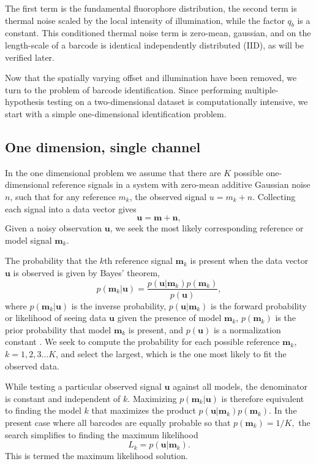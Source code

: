 The first term is the fundamental fluorophore distribution, the second term is thermal noise scaled by the local intensity of illumination, while the factor $q_b$ is a constant. This conditioned thermal noise term is zero-mean, gaussian, and on the length-scale of a barcode is identical independently distributed (IID), as will be verified later.

Now that the spatially varying offset and illumination have been removed, we turn to the problem of barcode identification. Since performing multiple-hypothesis testing on a two-dimensional dataset is computationally intensive, we start with a simple one-dimensional identification problem. 

\subsection{One dimension, single channel}
In the one dimensional problem we assume that there are $K$ possible one-dimensional reference signals in a system with zero-mean additive Gaussian noise $n$, such that for any reference $m_k$, the observed signal $u=m_k+n$. Collecting each signal into a data vector gives
\begin{equation}
\mathbf{u}=\mathbf{m} + \mathbf{n},
\end{equation}
Given a noisy observation $\mathbf{u}$, we seek the most likely corresponding reference or model signal $\mathbf{m}_k$. 

The probability that the $k$th reference signal $\mathbf{m}_k$ is present when the data vector $\mathbf{u}$ is observed is given by Bayes' theorem,
\begin{equation}\label{eq:Bayes}
p(\mathbf{m}_k|\mathbf{u}) = \frac{p(\mathbf{u}|\mathbf{m}_k)p(\mathbf{m}_k)} {p(\mathbf{u})},
\end{equation}
where $p(\mathbf{m}_k|\mathbf{u})$ is the inverse probability, $p(\mathbf{u}|\mathbf{m}_k)$ is the forward probability or likelihood of seeing data $\mathbf{u}$ given the presence of model $\mathbf{m}_k$, $p(\mathbf{m}_k)$ is the prior probability that model $\mathbf{m}_k$ is present, and $p(\mathbf{u})$ is a normalization constant \citep{bretthorst_probability_2003}. We seek to compute the probability for each possible reference $\mathbf{m}_k$, $k=1,2,3 \ldots K$, and select the largest, which is the one most likely to fit the observed data.

While testing a particular observed signal $\mathbf{u}$ against all models, the denominator is constant and independent of $k$. Maximizing $p(\mathbf{m}_k|\mathbf{u})$ is therefore equivalent to finding the model $k$ that maximizes the product  $p(\mathbf{u}|\mathbf{m}_k)p(\mathbf{m}_k)$.
In the present case where all barcodes are equally probable so that
$p(\mathbf{m}_k)=1/K,$ 
the search simplifies to finding the maximum likelihood 
\begin{equation}
L_k = p(\mathbf{u}|\mathbf{m}_k).
\end{equation}
This is termed the maximum likelihood solution.


